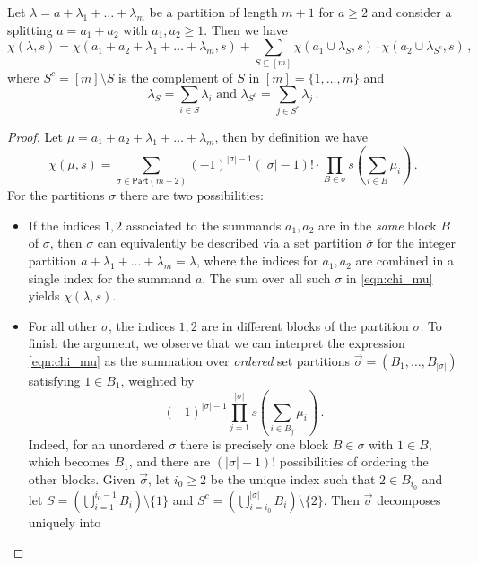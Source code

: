 \documentclass[authorcolumns,numberwithinsect]{no-lipics-v2022}
\begin{document}
\begin{lemma} \label{Lem:chi_recursion}
Let $\lambda = a + \lambda_1 + \ldots + \lambda_m$ be a partition of length $m+1$ for $a \geq 2$ and consider a splitting $a  = a_1 + a_2$ with $a_1, a_2 \geq 1$. Then we have
\begin{equation}  \label{eqn:chi_recursion}
\chi(\lambda, s) = \chi(a_1 + a_2 + \lambda_1 + \ldots + \lambda_m, s) + \sum_{S \subseteq [m]} \chi(a_1 \cup \lambda_S, s) \cdot \chi(a_2 \cup \lambda_{S^c}, s)\,,
\end{equation}
where $S^c = [m] \setminus S$ is the complement of $S$ in $[m]=\{1, \ldots, m\}$ and
\[
\lambda_S = \sum_{i \in S} \lambda_i \text{ and } \lambda_{S^c} = \sum_{j \in S^c} \lambda_j\,.
\]
\end{lemma}
\begin{proof}
Let $\mu = a_1 + a_2 + \lambda_1 + \ldots + \lambda_m$, then by definition we have
\begin{equation} \label{eqn:chi_mu}
\chi(\mu, s) = \sum_{\sigma \in \mathsf{Part}(m+2)} (-1)^{|\sigma|-1} (|\sigma|-1)! \cdot \prod_{B \in \sigma} s(\sum_{i \in B} \mu_i)\,.
\end{equation}
For the partitions $\sigma$ there are two possibilities:
\begin{itemize}
    \item If the indices $1,2$ associated to the summands $a_1, a_2$ are in the \emph{same} block $B$ of $\sigma$, then $\sigma$ can equivalently be described via a set partition $\overline \sigma$ for the integer partition $a + \lambda_1 + \ldots + \lambda_m=\lambda$, where the indices for $a_1, a_2$ are combined in a single index for the summand $a$. The sum over all such $\sigma$ in \eqref{eqn:chi_mu} yields $\chi(\lambda, s)$.
    \item For all other $\sigma$, the indices $1,2$ are in different blocks of the partition $\sigma$. To finish the argument, we observe that we can interpret the expression \eqref{eqn:chi_mu} as the summation over \emph{ordered} set partitions $\vec \sigma = (B_1, \ldots, B_{|\sigma|})$ satisfying $1 \in B_1$, weighted by 
    \begin{equation} \label{eqn:ordered_set_part_weight}
        (-1)^{|\sigma|-1} \prod_{j=1}^{|\sigma|} s(\sum_{i \in B_j} \mu_i)\,.
    \end{equation}
    Indeed, for an unordered $\sigma$ there is precisely one block $B \in \sigma$ with $1 \in B$, which becomes $B_1$, and there are $(|\sigma|-1)!$ possibilities of ordering the other blocks. Given $\vec \sigma$, let $i_0 \geq 2$ be the unique index such that $2 \in B_{i_0}$ and let $S = (\bigcup_{i=1}^{i_0-1} B_i) \setminus \{1\}$ and $S^c = (\bigcup_{i=i_0}^{|\sigma|} B_i) \setminus \{2\}$. Then $\vec \sigma$ decomposes uniquely into

\end{itemize}
\end{proof}
\end{document}
